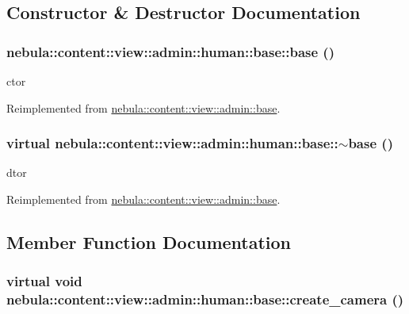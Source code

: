 \subsection{Constructor \& Destructor Documentation}
\hypertarget{classnebula_1_1content_1_1view_1_1admin_1_1human_1_1base_a681eda36fa571b801d5369f2834ca119}{
\subsubsection[{base}]{\setlength{\rightskip}{0pt plus 5cm}nebula::content::view::admin::human::base::base ()}}
\label{classnebula_1_1content_1_1view_1_1admin_1_1human_1_1base_a681eda36fa571b801d5369f2834ca119}


ctor 

Reimplemented from \hyperlink{classnebula_1_1content_1_1view_1_1admin_1_1base_a42c5f438bf2b5a658aaa1849e8a1be1c}{nebula::content::view::admin::base}.\hypertarget{classnebula_1_1content_1_1view_1_1admin_1_1human_1_1base_a93ed0174628fa1e1cb7c08986ae7131c}{
\subsubsection[{$\sim$base}]{\setlength{\rightskip}{0pt plus 5cm}virtual nebula::content::view::admin::human::base::$\sim$base ()}}
\label{classnebula_1_1content_1_1view_1_1admin_1_1human_1_1base_a93ed0174628fa1e1cb7c08986ae7131c}


dtor 

Reimplemented from \hyperlink{classnebula_1_1content_1_1view_1_1admin_1_1base_adf0b4240e57271d4f381cde906367633}{nebula::content::view::admin::base}.

\subsection{Member Function Documentation}
\hypertarget{classnebula_1_1content_1_1view_1_1admin_1_1human_1_1base_a3cfdc93ec0d6d15b65cbd82f4c49e61f}{
\subsubsection[{create\_\-camera}]{\setlength{\rightskip}{0pt plus 5cm}virtual void nebula::content::view::admin::human::base::create\_\-camera ()}}
\label{classnebula_1_1content_1_1view_1_1admin_1_1human_1_1base_a3cfdc93ec0d6d15b65cbd82f4c49e61f}


